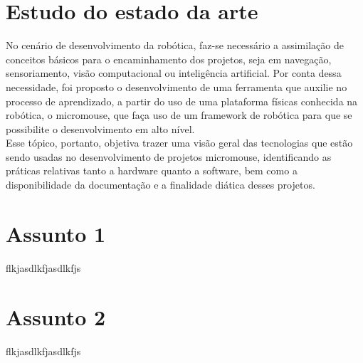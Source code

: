 \section{Estudo do estado da arte}
\label{sec:sota}
 \hspace{0.5cm} No cenário de desenvolvimento da robótica, faz-se necessário a assimilação de conceitos básicos para o encaminhamento dos projetos, seja em navegação, sensoriamento, visão computacional ou inteligência artificial. Por conta dessa necessidade, foi proposto o desenvolvimento de uma ferramenta que auxilie no processo de aprendizado, a partir do uso de uma plataforma físicas conhecida na robótica, o micromouse, que  faça uso de um framework de robótica para que se possibilite o desenvolvimento em alto nível. \\
 \hspace{0.5cm}  Esse tópico, portanto, objetiva trazer uma visão geral das tecnologias que estão sendo usadas no desenvolvimento de projetos micromouse, identificando as práticas relativas tanto a hardware quanto a software, bem como a disponibilidade da documentação e a finalidade diática desses projetos. 


\section{Assunto 1}
\label{sec:ass1}
flkjasdlkfjasdlkfjs

\section{Assunto 2}
\label{sec:ass2}
flkjasdlkfjasdlkfjs

